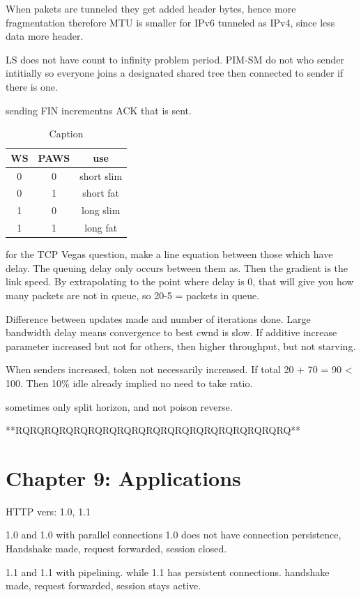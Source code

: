 \documentclass[12pt]{book}
\begin{document}
When pakets are tunneled they get added header bytes, hence more fragmentation therefore MTU is smaller for IPv6 tunneled as IPv4, since less data more header.

LS does not have count to infinity problem period.
PIM-SM do not who sender intitially so everyone joins a designated shared tree then connected to sender if there is one.

sending FIN incrementns ACK that is sent.

\begin{table}[H]
    \centering
    \begin{tabular}{|c|c|c|}
    \hline
         WS & PAWS & use \\ \hline
         0 & 0 & short slim \\ \hline
         0 & 1 & short fat \\ \hline
         1 & 0 & long slim \\ \hline
         1 & 1 & long fat \\ \hline
    \end{tabular}
    \caption{Caption}
    \label{tab:my_label}
\end{table}

for the TCP Vegas question, make a line equation between those which have delay. The queuing delay only occurs between them as. Then the gradient is the link speed. By extrapolating to the point where delay is 0, that will give you how many packets are not in queue, so 20-5 = packets in queue.

Difference between updates made and number of iterations done.
Large bandwidth delay means convergence to best cwnd is slow.
If additive increase parameter increased but not for others, then higher throughput, but not starving.

When senders increased, token not necessarily increased.
If total 20 + 70 = 90 < 100. Then 10\% idle already implied no need to take ratio.

sometimes only split horizon, and not poison reverse.

**RQRQRQRQRQRQRQRQRQRQRQRQRQRQRQRQRQRQRQ**


\chapter{Chapter 9: Applications}

HTTP vers:
1.0, 1.1

1.0 and 1.0 with parallel connections
1.0 does not have connection persistence,
Handshake made, request forwarded, session closed.

1.1 and 1.1 with pipelining.
while 1.1 has persistent connections.
handshake made, request forwarded, session stays active.
\end{document}
